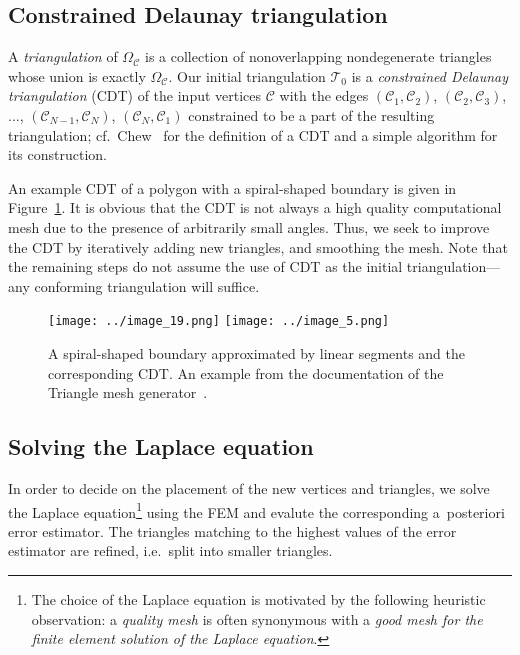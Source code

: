 \documentclass[11pt]{article}
\begin{document}
\subsection{Constrained Delaunay triangulation}
\label{sec:cdt}

A \emph{triangulation} of \(\Omega_{\mathcal{C}}\) is a collection of
nonoverlapping nondegenerate triangles whose union is exactly
\(\Omega_{\mathcal{C}}\).  Our initial triangulation \(\mathcal{T}_0\) is a
\emph{constrained Delaunay triangulation} (CDT) of the input vertices
\(\mathcal{C}\) with the edges \((\mathcal{C}_1, \mathcal{C}_2)\),
\((\mathcal{C}_2,\mathcal{C}_3)\), \(\dots\), \((\mathcal{C}_{N-1},
\mathcal{C}_N)\), \((\mathcal{C}_N, \mathcal{C}_1)\) constrained to be a part of
the resulting triangulation; cf.~Chew~\cite{Chew_1987} for the definition of a
CDT and a simple algorithm for its construction.

An example CDT of a polygon with a spiral-shaped boundary is given in
Figure~\ref{fig:cdt}. It is obvious that the CDT is not always a high quality
computational mesh due to the presence of arbitrarily small angles.  Thus, we
seek to improve the CDT by iteratively adding new triangles, and smoothing the
mesh.  Note that the remaining steps do not assume the use of CDT as the initial
triangulation---any conforming triangulation will suffice.

\begin{figure}[htbp]
  \centering
  \texttt{[image: ../image\_19.png]}
  \texttt{[image: ../image\_5.png]}
\caption{A spiral-shaped boundary approximated by linear segments and the corresponding
  CDT.  An example from the documentation of the
Triangle mesh generator~\cite{shewchuk1996triangle}.}
\label{fig:cdt}
\end{figure}

\subsection{Solving the Laplace equation}
\label{sec:poisson}

In order to decide on the placement of the new vertices and triangles, we solve
the Laplace equation\footnote{The choice of the Laplace equation is motivated by
the following heuristic observation: a \emph{quality mesh} is often synonymous with a \emph{good mesh for the
finite element solution of the Laplace equation}.} using the FEM and evalute the
corresponding a~posteriori error estimator.  The triangles matching
to the highest values of the error estimator are refined, i.e.~split
into smaller triangles.
\end{document}
